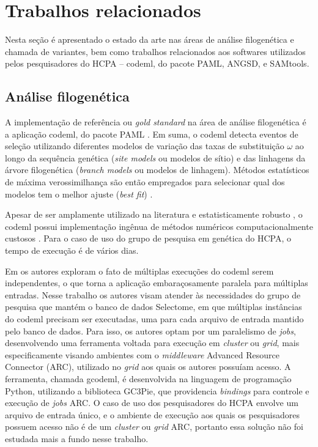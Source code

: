\documentclass[cic,tc]{iiufrgs}
\begin{document}
%
%
%
%

\chapter{Trabalhos relacionados}
\label{chap:anteriores}

Nesta seção é apresentado o estado da arte nas áreas de análise filogenética e
chamada de variantes, bem como trabalhos relacionados aos softwares utilizados
pelos pesquisadores do HCPA -- codeml, do pacote PAML, ANGSD, e SAMtools.

\section{Análise filogenética}

A implementação de referência ou \textit{gold standard} na área de análise
filogenética é a aplicação codeml, do pacote PAML \cite{valle2014optimization}.
Em suma, o codeml detecta eventos de seleção utilizando diferentes modelos de
variação das taxas de substituição $\omega$ ao longo da sequência genética
(\textit{site models} ou modelos de sítio) e das linhagens da árvore
filogenética (\textit{branch models} ou modelos de linhagem). Métodos
estatísticos de máxima verossimilhança são então empregados para selecionar
qual dos modelos tem o melhor ajuste (\textit{best fit}) \cite{yang2007paml}.

Apesar de ser amplamente utilizado na literatura e estatisticamente
robusto \cite{maldonado2016lmap}, o codeml possui implementação ingênua de
métodos numéricos computacionalmente custosos \cite{yang2020paml}. Para o caso
de uso do grupo de pesquisa em genética do HCPA, o tempo de execução é de
vários dias.

Em \cite{moretti2012gcodeml} os autores exploram o fato de múltiplas execuções
do codeml serem independentes, o que torna a aplicação embaraçosamente
paralela para múltiplas entradas. Nesse trabalho os autores visam atender às
necessidades do grupo de pesquisa que mantém o banco de dados Selectome, em
que múltiplas instâncias do codeml precisam ser executadas, uma para cada
arquivo de entrada mantido pelo banco de dados. Para isso, os autores optam
por um paralelismo de \textit{jobs}, desenvolvendo uma ferramenta voltada
para execução em \textit{cluster} ou \textit{grid}, mais especificamente
visando ambientes com o \textit{middleware} Advanced Resource Connector (ARC),
utilizado no \textit{grid} aos quais os autores possuíam acesso. A ferramenta,
chamada gcodeml, é desenvolvida na linguagem de programação Python, utilizando
a biblioteca GC3Pie, que providencia \textit{bindings} para controle e execução
de \textit{jobs} ARC. O caso de uso dos pesquisadores do HCPA envolve um
arquivo de entrada único, e o ambiente de execução aos quais os pesquisadores
possuem acesso não é de um \textit{cluster} ou \textit{grid} ARC, portanto essa
solução não foi estudada mais a fundo nesse trabalho.
\end{document}
